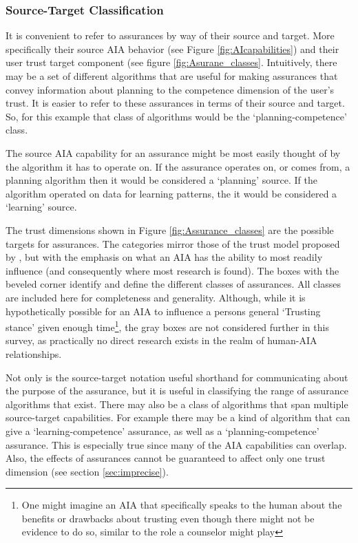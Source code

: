 \subsubsection{Source-Target Classification}
    It is convenient to refer to assurances by way of their source and target. More specifically their source AIA behavior (see Figure \ref{fig:AIcapabilities}) and their user trust target component (see figure \ref{fig:Asurane_classes}. Intuitively, there may be a set of different algorithms that are useful for making assurances that convey information about planning to the competence dimension of the user's trust. It is easier to refer to these assurances in terms of their source and target. So, for this example that class of algorithms would be the `planning-competence' class.

    The source AIA capability for an assurance might be most easily thought of by the algorithm it has to operate on. If the assurance operates on, or comes from, a planning algorithm then it would be considered a `planning' source. If the algorithm operated on data for learning patterns, the it would be considered a `learning' source.

    The trust dimensions shown in Figure \ref{fig:Assurance_classes} are the possible targets for assurances. The categories mirror those of the trust model proposed by \citet{McKnight2001-fa}, but with the emphasis on what an AIA has the ability to most readily influence (and consequently where most research is found). The boxes with the beveled corner identify and define the different classes of assurances. All classes are included here for completeness and generality. Although, while it is hypothetically possible for an AIA to influence a persons general `Trusting stance' given enough time\footnote{One might imagine an AIA that specifically speaks to the human about the benefits or drawbacks about trusting even though there might not be evidence to do so, similar to the role a counselor might play}, the gray boxes are not considered further in this survey, as practically no direct research exists in the realm of human-AIA relationships.
    
    Not only is the source-target notation useful shorthand for communicating about the purpose of the assurance, but it is useful in classifying the range of assurance algorithms that exist. There may also be a class of algorithms that span multiple source-target capabilities. For example there may be a kind of algorithm that can give a `learning-competence' assurance, as well as a `planning-competence' assurance. This is especially true since many of the AIA capabilities can overlap. Also, the effects of assurances cannot be guaranteed to affect only one trust dimension (see section \ref{sec:imprecise}).
